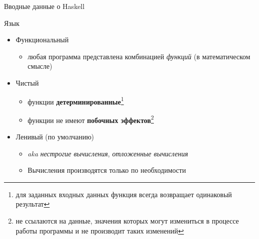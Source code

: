 \documentclass{beamer}
\begin{document}
    \begin{frame}{Вводные данные о Haskell}
      
      \begin{block}{Язык}
          \begin{itemize}
              \item Функциональный
                \begin{itemize}
                    \item любая программа представлена комбинацией \textit{функций} (в математическом смысле)
                \end{itemize}
              \item Чистый
                \begin{itemize}
                    \item функции \textbf{детерминированные}\footnote{для заданных входных данных функция всегда возвращает одинаковый результат}
                    \item функции не имеют \textbf{побочных эффектов}\footnote{не ссылаются на данные, значения которых могут измениться в процессе работы программы и не производит таких изменений}
                \end{itemize}
              \item Ленивый (по умолчанию)
                \begin{itemize}
                    \item \textit{aka} \textit{нестрогие вычисления}, \textit{отложенные вычисления}
                    \item Вычисления производятся только по необходимости
                \end{itemize}
          \end{itemize}
      \end{block}
  \end{frame}
\end{document}
